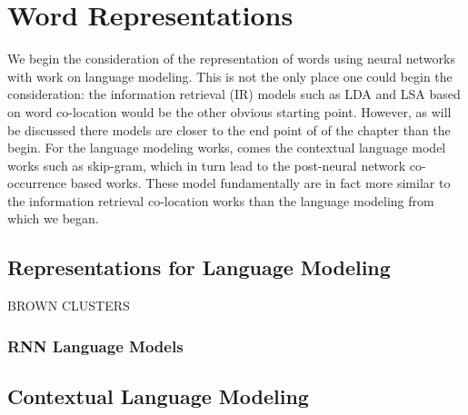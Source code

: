 \documentclass[12pt,parskip]{komatufte}
\begin{document}
\chapter{Word Representations}\label{sec:word-representations}


We begin the consideration of the representation of words using neural networks with work on language modeling.
This is not the only place one could begin the consideration: the information retrieval (IR) models such as LDA and LSA based on word co-location would be the other obvious starting point.
However, as will be discussed there models are closer to the end point of of the chapter than the begin.
For the language modeling works, comes the contextual language model works such as skip-gram, which in turn lead to the post-neural network co-occurrence based works.
These model fundamentally are in fact more similar to the information retrieval co-location works than the language modeling from which we began.


\section{Representations for Language Modeling}
\textcite{NPLM} 
BROWN CLUSTERS

\textcite{collobert2008unified}



\subsection{RNN Language Models}
\textcite{mikolov2011RnnLM,mikolov2010recurrent,6163930}

\section{Contextual Language Modeling}

\textcite{mikolov2012contextRNNLM}
\end{document}
